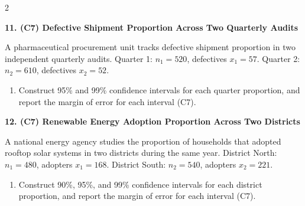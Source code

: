 \documentclass[12pt]{article}
\newcommand{\SubsectionBox}[1]{%
	\noindent\colorbox{gray!30}{%
		\parbox{\linewidth}{\textbf{#1}}%
	}\par\vspace{0.35cm}%
}
\begin{document}
\begin{multicols}{2}
		\vspace{0.25cm}
		\SubsectionBox{11. (C7) Defective Shipment Proportion Across Two Quarterly Audits}\vspace{-0.25cm}
		A pharmaceutical procurement unit tracks defective shipment proportion in two independent quarterly audits.
		Quarter 1: $n_1=520$, defectives $x_1=57$.
		Quarter 2: $n_2=610$, defectives $x_2=52$.
		\begin{enumerate}
			\item Construct 95\% and 99\% confidence intervals for each quarter proportion, and report the margin of error for each interval (C7).
		\end{enumerate}
		
		\vspace{0.25cm}
		\SubsectionBox{12. (C7) Renewable Energy Adoption Proportion Across Two Districts}\vspace{-0.25cm}
		A national energy agency studies the proportion of households that adopted rooftop solar systems in two districts during the same year.
		District North: $n_1=480$, adopters $x_1=168$.
		District South: $n_2=540$, adopters $x_2=221$.
		\begin{enumerate}
			\item Construct 90\%, 95\%, and 99\% confidence intervals for each district proportion, and report the margin of error for each interval (C7).
		\end{enumerate}
	\end{multicols}
	
\end{document}
